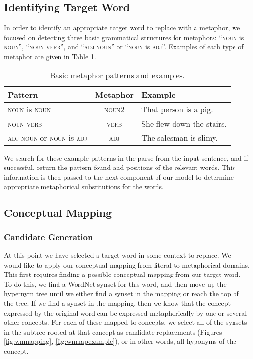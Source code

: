 \documentclass[12pt]{article}
\begin{document}
\subsection{Identifying Target Word}
\label{sec:identtarget}
In order to identify an appropriate target word to replace with a metaphor, we focused on detecting three basic grammatical structures for metaphors: ``\textsc{noun} is \textsc{noun}'', ``\textsc{noun} \textsc{verb}'', and ``\textsc{adj} \textsc{noun}'' or ``\textsc{noun} is \textsc{adj}''.  Examples of each type of metaphor are given in Table \ref{tab:metaphorexamples}.

\begin{table}[h]
	\centering
	\small
	\begin{tabular}{|l|c|l|} \hline
		\textbf{Pattern} & \textbf{Metaphor} & \textbf{Example}\\	\hline
		\textsc{noun} is \textsc{noun} & \textsc{noun2} & That person is a pig.\\ \hline
		\textsc{noun} \textsc{verb} & \textsc{verb} & She flew down the stairs.\\ \hline
		\textsc{adj} \textsc{noun} or \textsc{noun} is \textsc{adj} & \textsc{adj} & The salesman is slimy.\\ \hline
	\end{tabular}
	\caption{Basic metaphor patterns and examples.}
	\label{tab:metaphorexamples}
\end{table}

We search for these example patterns in the parse from the input sentence, and if successful, return the pattern found and positions of the relevant words.  This information is then passed to the next component of our model to determine appropriate metaphorical substitutions for the words.

\subsection{Conceptual Mapping}

\subsubsection{Candidate Generation}

At this point we have selected a target word in some context to replace. We would like to apply our conceptual mapping from literal to metaphorical domains. This first requires finding a possible conceptual mapping from our target word. To do this, we find a WordNet synset for this word, and then move up the hypernym tree until we either find a synset in the mapping or reach the top of the tree. If we find a synset in the mapping, then we know that the concept expressed by the original word can be expressed metaphorically by one or several other concepts. For each of these mapped-to concepts, we select all of the synsets in the subtree rooted at that concept as candidate replacements (Figures \ref{fig:wnmapping}, \ref{fig:wnmapexample}), or in other words, all hyponyms of the concept.
\end{document}

